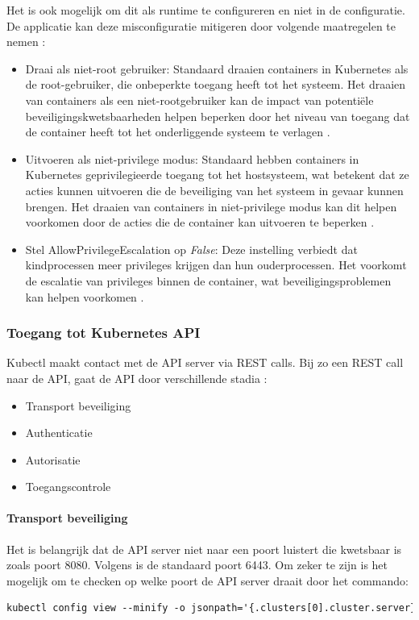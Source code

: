 Het is ook mogelijk om dit als runtime te configureren en niet in de configuratie. De applicatie kan deze misconfiguratie mitigeren door volgende maatregelen te nemen \autocite{OWASP-2023}:
\begin{itemize}
    \item Draai als niet-root gebruiker: Standaard draaien containers in Kubernetes als de root-gebruiker, die onbeperkte toegang heeft tot het systeem. Het draaien van containers als een niet-rootgebruiker kan de impact van potentiële beveiligingskwetsbaarheden helpen beperken door het niveau van toegang dat de container heeft tot het onderliggende systeem te verlagen \autocite{OWASP-2023}.
    \item Uitvoeren als niet-privilege modus: Standaard hebben containers in Kubernetes geprivilegieerde toegang tot het hostsysteem, wat betekent dat ze acties kunnen uitvoeren die de beveiliging van het systeem in gevaar kunnen brengen. Het draaien van containers in niet-privilege modus kan dit helpen voorkomen door de acties die de container kan uitvoeren te beperken \autocite{OWASP-2023}.
    \item Stel AllowPrivilegeEscalation op \textit{False}: Deze instelling verbiedt dat kindprocessen meer privileges krijgen dan hun ouderprocessen. Het voorkomt de escalatie van privileges binnen de container, wat beveiligingsproblemen kan helpen voorkomen \autocite{OWASP-2023}.
\end{itemize}

\subsubsection{Toegang tot Kubernetes API}
Kubectl maakt contact met de API server via REST calls. Bij zo een REST call naar de API, gaat de API door verschillende stadia \autocite{KubernetesDocs-2023}: 
\begin{itemize}
    \item Transport beveiliging
    \item Authenticatie
    \item Autorisatie
    \item Toegangscontrole
\end{itemize}
\paragraph{Transport beveiliging}
Het is belangrijk dat de API server niet naar een poort luistert die kwetsbaar is zoals poort 8080. Volgens \autocite{KubernetesDocs-2023} is de standaard poort 6443. Om zeker te zijn is het mogelijk om te checken op welke poort de API server draait door het commando:
\begin{lstlisting}[language=tex, caption={Checken welke poort de API server draait}]
kubectl config view --minify -o jsonpath='{.clusters[0].cluster.server}'
\end{lstlisting}

